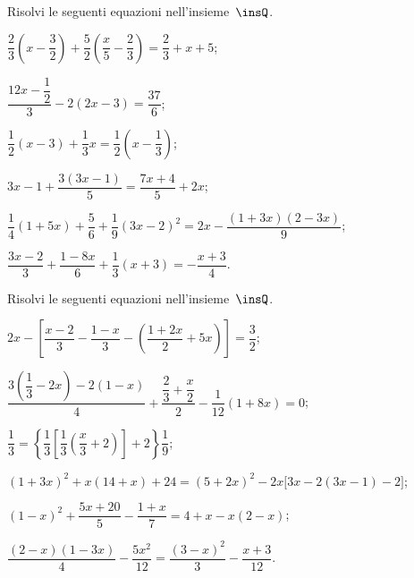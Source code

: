 \pagebreak

\begin{esercizio}[\Ast]
\label{ese:15.37}
Risolvi le seguenti equazioni nell'insieme~$\insQ$.
\begin{enumeratea}
 \item $\dfrac{2}{3}\left(x-\dfrac{3}{2}\right)+\dfrac{5}{2}\left(\dfrac{x}{5}-\dfrac{2}{3}\right)=\dfrac{2}{3}+x+5$;
 \item $\dfrac{12x-\dfrac{1}{2}}{3}-2(2x-3)=\dfrac{37}{6}$;
 \item $\dfrac{1}{2}(x-3)+\dfrac{1}{3}x=\dfrac{1}{2}\left(x-\dfrac{1}{3}\right)$;
 \item $3x-1+\dfrac{3(3x-1)}{5}=\dfrac{7x+4}{5}+2x$;
 \item $\dfrac{1}{4}(1+5x)+\dfrac{5}{6}+\dfrac{1}{9}(3x-2)^{2}=2x-\dfrac{(1+3x)(2-3x)}{9}$;
 \item $\dfrac{3x-2}{3}+\dfrac{1-8x}{6}+\dfrac{1}{3}(x+3)=-\dfrac{x+3}{4}$.
\end{enumeratea}
\end{esercizio}

\begin{esercizio}[\Ast]
\label{ese:15.38}
Risolvi le seguenti equazioni nell'insieme~$\insQ$.
\begin{enumeratea}
 \item $2x-\left[\dfrac{x-2}{3}-\dfrac{1-x}{3}-\left(\dfrac{1+2x}{2}+5x\right)\right]=\dfrac{3}{2}$;
 \item $\dfrac{3\left(\dfrac{1}{3}-2x\right)-2(1-x)}{4}+\dfrac{\dfrac{2}{3}+\dfrac{x}{2}}{2}-\dfrac{1}{12}(1+8x)=0$;
 \item $\dfrac{1}{3}=\left\lbrace\dfrac{1}{3}\left[\dfrac{1}{3}\left(\dfrac{x}{3}+2\right)\right]+2 \right\rbrace\dfrac{1}{9}$;
 \item $(1+3x)^{2}+x(14+x)+24=(5+2x)^{2}-2x\big[3x-2(3x-1)-2\big]$;
 \item $(1-x)^{2}+\dfrac{5x+20}{5}-\dfrac{1+x}{7}=4+x-x(2-x)$;
 \item $\dfrac{(2-x)(1-3x)}{4}-\dfrac{5x^{2}}{12}=\dfrac{(3-x)^{2}}{3}-\dfrac{x+3}{12}$.
\end{enumeratea}
\end{esercizio}

